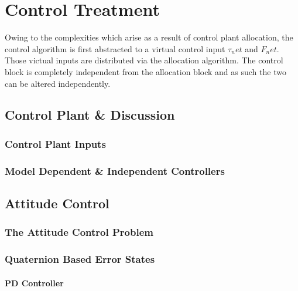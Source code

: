 \chapter{Control Treatment}
\label{ch:control}
Owing to the complexities which arise as a result of control plant allocation, the control algorithm is first abstracted to a virtual control input $\tau_net$ and $F_net$. Those victual inputs are distributed via the allocation algorithm. The control block is completely independent from the allocation block and as such the two can be altered independently.
\section*{Control Plant \& Discussion}
\subsection*{Control Plant Inputs}
\subsection*{Model Dependent \& Independent Controllers}

\section{Attitude Control}
\label{sec:control.attitude}
\subsection{The Attitude Control Problem}
\label{subsec:control.attitude.problem}
\subsection{Quaternion Based Error States}
\label{subsec:control.attitude.quaternion}
\subsubsection{PD Controller}
